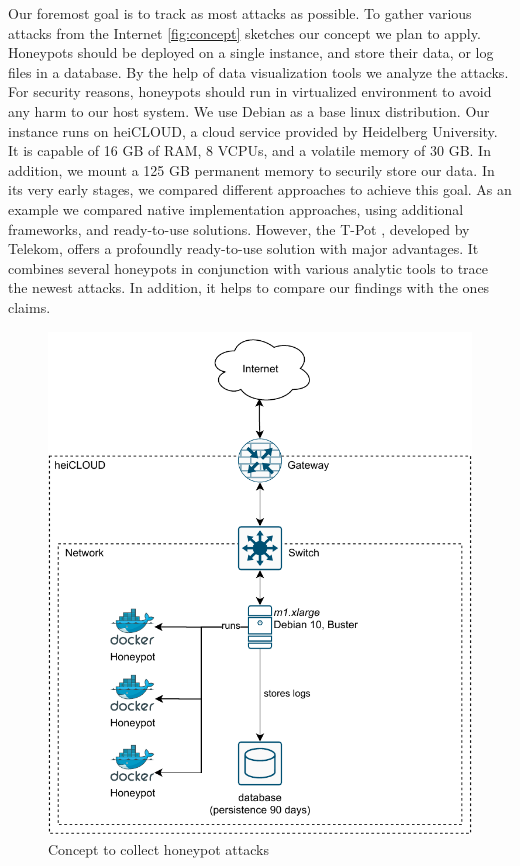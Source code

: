 Our foremost goal is to track as most attacks as possible.
To gather various attacks from the Internet \autoref{fig:concept} sketches our concept we plan to apply.
Honeypots should be deployed on a single instance, and store their data, or log files in a database.
By the help of data visualization tools we analyze the attacks.
For security reasons, honeypots should run in virtualized environment to avoid any harm to our host system.
We use Debian as a base linux distribution.
Our instance runs on heiCLOUD, a cloud service provided by Heidelberg University.
It is capable of 16 GB of RAM, 8 VCPUs, and a volatile memory of 30 GB.
In addition, we mount a 125 GB permanent memory to securily store our data.
In its very early stages, we compared different approaches to achieve this goal.
As an example we compared native implementation approaches, using additional frameworks, and ready-to-use solutions.
However, the T-Pot , developed by Telekom, offers a profoundly ready-to-use solution with major advantages.
It combines several honeypots in conjunction with various analytic tools to trace the newest attacks.
In addition, it helps to compare our findings with the ones \citet{Kelly2021} claims.

\begin{figure}[h]
    \centering
    \includegraphics{figures/concept.pdf}
    \caption[Draft for data collection]{Concept to collect honeypot attacks}
    \label{fig:concept}
\end{figure}

